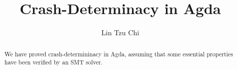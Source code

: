 \documentclass[letterpaper,twocolumn,10pt]{article}
\theoremstyle{definition}
\begin{document}
\title{Crash-Determinacy in Agda}
\author{Lin Tzu Chi}
\maketitle

\begin{abstract}
We have proved crash-determininacy in Agda, assuming that some essential properties have been verified by an SMT solver.
\end{abstract}













\end{document}
